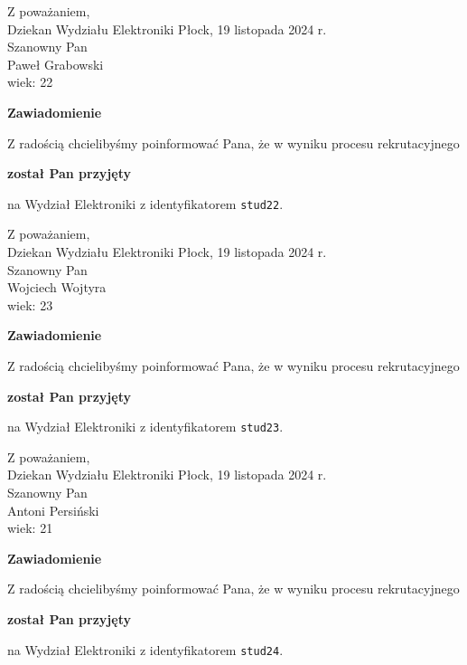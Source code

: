 \documentclass[12pt,a4paper]{article}
\begin{document}
\noindent
Z poważaniem,\\
Dziekan
Wydziału Elektroniki
\newpage
\hfill Płock, 19 listopada 2024 r.\\ 
\noindent 
Szanowny Pan \\
Paweł Grabowski \\
wiek: 22

\bigskip

\begin{center}
{\Large\textbf{Zawiadomienie}}
\end{center}
\bigskip
Z radością chcielibyśmy poinformować Pana, że w wyniku procesu rekrutacyjnego
\begin{center}
\textsf{\textbf{został Pan przyjęty}} 
\end{center}
na Wydział Elektroniki z identyfikatorem \verb|stud22|.
\vspace{2cm}

\noindent
Z poważaniem,\\
Dziekan
Wydziału Elektroniki
\newpage
\hfill Płock, 19 listopada 2024 r.\\ 
\noindent 
Szanowny Pan \\
Wojciech Wojtyra \\
wiek: 23

\bigskip

\begin{center}
{\Large\textbf{Zawiadomienie}}
\end{center}
\bigskip
Z radością chcielibyśmy poinformować Pana, że w wyniku procesu rekrutacyjnego
\begin{center}
\textsf{\textbf{został Pan przyjęty}} 
\end{center}
na Wydział Elektroniki z identyfikatorem \verb|stud23|.
\vspace{2cm}

\noindent
Z poważaniem,\\
Dziekan
Wydziału Elektroniki
\newpage
\hfill Płock, 19 listopada 2024 r.\\ 
\noindent 
Szanowny Pan \\
Antoni Persiński \\
wiek: 21

\bigskip

\begin{center}
{\Large\textbf{Zawiadomienie}}
\end{center}
\bigskip
Z radością chcielibyśmy poinformować Pana, że w wyniku procesu rekrutacyjnego
\begin{center}
\textsf{\textbf{został Pan przyjęty}} 
\end{center}
na Wydział Elektroniki z identyfikatorem \verb|stud24|.
\vspace{2cm}
\end{document}
